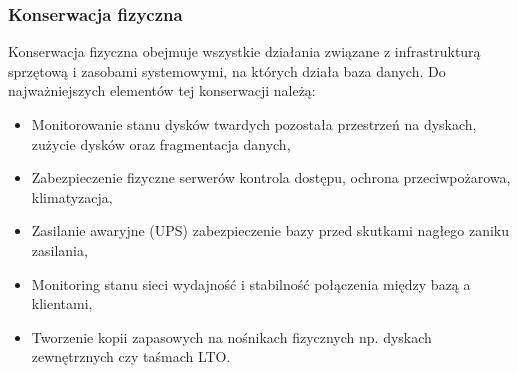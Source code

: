 \documentclass[letterpaper,10pt,polish]{sphinxmanual}
\begin{document}
\subsubsection{Konserwacja fizyczna}
\label{\detokenize{rozdzial2/Kontrola_i_konserwacja/kontrola_i_konserwacja:konserwacja-fizyczna}}
\sphinxAtStartPar
Konserwacja fizyczna obejmuje wszystkie działania związane z infrastrukturą sprzętową i zasobami systemowymi, na których działa baza danych. Do najważniejszych elementów tej konserwacji należą:
\begin{itemize}
\item {} 
\sphinxAtStartPar
Monitorowanie stanu dysków twardych \textendash{} pozostała przestrzeń na dyskach, zużycie dysków oraz fragmentacja danych,

\item {} 
\sphinxAtStartPar
Zabezpieczenie fizyczne serwerów \textendash{} kontrola dostępu, ochrona przeciwpożarowa, klimatyzacja,

\item {} 
\sphinxAtStartPar
Zasilanie awaryjne (UPS) \sphinxhyphen{} zabezpieczenie bazy przed skutkami nagłego zaniku zasilania,

\item {} 
\sphinxAtStartPar
Monitoring stanu sieci \textendash{} wydajność i stabilność połączenia między bazą a klientami,

\item {} 
\sphinxAtStartPar
Tworzenie kopii zapasowych na nośnikach fizycznych \textendash{} np. dyskach zewnętrznych czy taśmach LTO.

\end{itemize}
\end{document}
